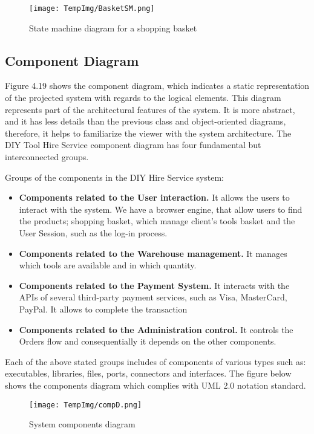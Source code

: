 \documentclass[fontsize=11pt]{extarticle}
\numberwithin{figure}{section} %
\numberwithin{table}{section}%
\begin{document}
\begin{figure}[H]
      \centering
      \texttt{[image: TempImg/BasketSM.png]}
      \caption{State machine diagram for a shopping basket}
\end{figure}

\hypertarget{component-diagram}{%
\subsection{Component Diagram}\label{component-diagram}}

Figure 4.19 shows the component diagram, which indicates a static
representation of the projected system with regards to the logical
elements. This diagram represents part of the architectural features of
the system. It is more abstract, and it has less details than the
previous class and object-oriented diagrams, therefore, it helps to
familiarize the viewer with the system architecture. The DIY Tool Hire
Service component diagram has four fundamental but interconnected
groups.

Groups of the components in the DIY Hire Service system:

\begin{itemize}
  \item \textbf{Components related to the User interaction.} It allows the users to interact with the system. We have a browser engine, that allow users to find the products; shopping basket, which manage client’s tools basket and the User Session, such as the log-in process.
  \item \textbf{Components related to the Warehouse management.} It manages which tools are available and in which quantity.
  \item \textbf{Components related to the Payment System.} It interacts with the APIs of several third-party payment services, such as Visa, MasterCard, PayPal. It allows to complete the transaction
  \item \textbf{Components related to the Administration control.} It controls the Orders flow and consequentially it depends on the other components. 
\end{itemize}

Each of the above stated groups includes of components of various types
such as: executables, libraries, files, ports, connectors and
interfaces. The figure below shows the components diagram which complies
with UML 2.0 notation standard.

\begin{figure}[H]
      \centering
      \texttt{[image: TempImg/compD.png]}
      \caption{System components diagram}
\end{figure}
\end{document}
